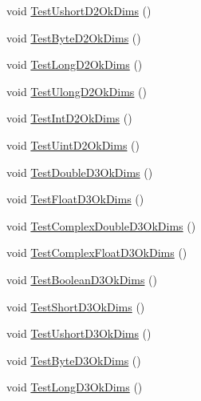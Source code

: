 \begin{DoxyCompactItemize}
\item 
void \mbox{\hyperlink{classkhiva_1_1array_1_1tests_1_1_array_tests_afd0e8ee98cb4a407188315575cb9b309}{Test\+Ushort\+D2\+Ok\+Dims}} ()
\item 
void \mbox{\hyperlink{classkhiva_1_1array_1_1tests_1_1_array_tests_a238d4d4316dd0c26c8d7112926a54cdd}{Test\+Byte\+D2\+Ok\+Dims}} ()
\item 
void \mbox{\hyperlink{classkhiva_1_1array_1_1tests_1_1_array_tests_a8e97c439b234c7b1306ec2f29b1bfd3b}{Test\+Long\+D2\+Ok\+Dims}} ()
\item 
void \mbox{\hyperlink{classkhiva_1_1array_1_1tests_1_1_array_tests_addeb68945cc2a49e18c66801db7180bc}{Test\+Ulong\+D2\+Ok\+Dims}} ()
\item 
void \mbox{\hyperlink{classkhiva_1_1array_1_1tests_1_1_array_tests_adaaf92e020b9da5159873b8b27f1416e}{Test\+Int\+D2\+Ok\+Dims}} ()
\item 
void \mbox{\hyperlink{classkhiva_1_1array_1_1tests_1_1_array_tests_ae28d8ff8122a577e8221967b6f6f4802}{Test\+Uint\+D2\+Ok\+Dims}} ()
\item 
void \mbox{\hyperlink{classkhiva_1_1array_1_1tests_1_1_array_tests_a1bcb85014bbd6d87a5e2b365b740855e}{Test\+Double\+D3\+Ok\+Dims}} ()
\item 
void \mbox{\hyperlink{classkhiva_1_1array_1_1tests_1_1_array_tests_aac32da18ed0177da086886e9b21be657}{Test\+Float\+D3\+Ok\+Dims}} ()
\item 
void \mbox{\hyperlink{classkhiva_1_1array_1_1tests_1_1_array_tests_afed406c7d7db8fe7fe3b5c6c5e3c8884}{Test\+Complex\+Double\+D3\+Ok\+Dims}} ()
\item 
void \mbox{\hyperlink{classkhiva_1_1array_1_1tests_1_1_array_tests_a09d4e2fa2669160ca62fa24840911dde}{Test\+Complex\+Float\+D3\+Ok\+Dims}} ()
\item 
void \mbox{\hyperlink{classkhiva_1_1array_1_1tests_1_1_array_tests_aebdfa8e27a220d8efc707ed3e1e03ece}{Test\+Boolean\+D3\+Ok\+Dims}} ()
\item 
void \mbox{\hyperlink{classkhiva_1_1array_1_1tests_1_1_array_tests_a520d8713a5a41a0352216e8521172565}{Test\+Short\+D3\+Ok\+Dims}} ()
\item 
void \mbox{\hyperlink{classkhiva_1_1array_1_1tests_1_1_array_tests_afe5d1db9f62fda2cd14823bacb1a6763}{Test\+Ushort\+D3\+Ok\+Dims}} ()
\item 
void \mbox{\hyperlink{classkhiva_1_1array_1_1tests_1_1_array_tests_aee404fb3de1308c6d803d23e487ed833}{Test\+Byte\+D3\+Ok\+Dims}} ()
\item 
void \mbox{\hyperlink{classkhiva_1_1array_1_1tests_1_1_array_tests_a382211ee8e488e9851bc03a21a871072}{Test\+Long\+D3\+Ok\+Dims}} ()

\end{DoxyCompactItemize}
